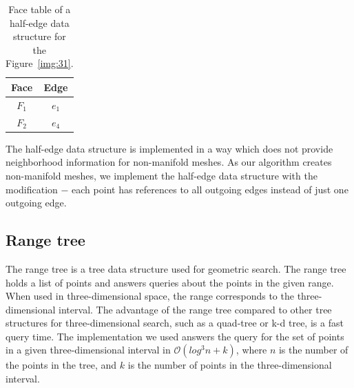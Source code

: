 \begin{table}[]
    \centering
    \begin{tabular}{|c|c|}
    \hline
    \hline
    Face  & Edge            \\ \hline\hline
    $F_1$ & $e_1$           \\ \hline
    $F_2$ & $e_4$           \\ \hline\hline
    \end{tabular}
\caption{Face table of a half-edge data structure for the Figure~\ref{img:31}.}
\label{tab:7}
\end{table}

The half-edge data structure is implemented in a way which does not provide 
neighborhood information for non-manifold meshes.
As our algorithm creates non-manifold meshes, we implement the half-edge data
structure with the modification $-$ each point has references to all outgoing edges
instead of just one outgoing edge. 

\subsection{Range tree}
The range tree is a tree data structure used for geometric search.
The range tree holds a list of points and answers queries about
the points in the given range. When used in three-dimensional space, 
the range corresponds to the three-dimensional interval.
The advantage of the range tree compared to other tree structures for 
three-dimensional search, such as a quad-tree or k-d tree, is a fast query
time. The implementation we used \cite{rangetree} answers the query for 
the set of points in a given three-dimensional
interval in $\mathcal{O}(log^3n+k)$, where $n$ is the number of
the points in the tree, and $k$ is the number of points in the three-dimensional
interval.

